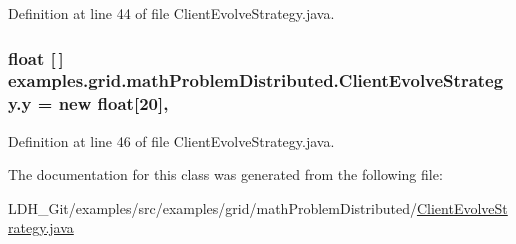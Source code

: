 Definition at line 44 of file Client\-Evolve\-Strategy.\-java.

\hypertarget{classexamples_1_1grid_1_1math_problem_distributed_1_1_client_evolve_strategy_a78a08fbfc56464ac25a1578cac4acefc}{
\subsubsection[{y}]{\setlength{\rightskip}{0pt plus 5cm}float \mbox{[}$\,$\mbox{]} examples.\-grid.\-math\-Problem\-Distributed.\-Client\-Evolve\-Strategy.\-y = new float\mbox{[}20\mbox{]}\hspace{0.3cm}{\ttfamily [static]}, {\ttfamily [private]}}}\label{classexamples_1_1grid_1_1math_problem_distributed_1_1_client_evolve_strategy_a78a08fbfc56464ac25a1578cac4acefc}


Definition at line 46 of file Client\-Evolve\-Strategy.\-java.



The documentation for this class was generated from the following file\-:\begin{DoxyCompactItemize}
\item 
L\-D\-H\-\_\-\-Git/examples/src/examples/grid/math\-Problem\-Distributed/\hyperlink{math_problem_distributed_2_client_evolve_strategy_8java}{Client\-Evolve\-Strategy.\-java}\end{DoxyCompactItemize}
